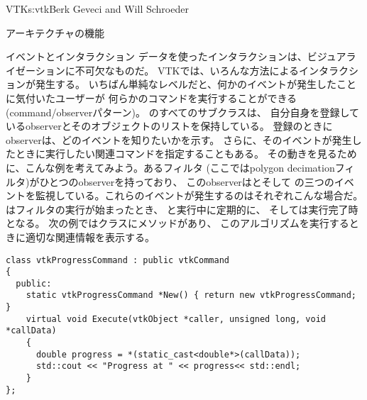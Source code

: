 \begin{aosachapter}{VTK}{s:vtk}{Berk Geveci and Will Schroeder}
\begin{aosasect1}{アーキテクチャの機能}
\begin{aosasect2}{イベントとインタラクション}
データを使ったインタラクションは、ビジュアライゼーションに不可欠なものだ。
VTKでは、いろんな方法によるインタラクションが発生する。
いちばん単純なレベルだと、何かのイベントが発生したことに気付いたユーザーが
何らかのコマンドを実行することができる(command/observerパターン)。
のすべてのサブクラスは、
自分自身を登録しているobserverとそのオブジェクトのリストを保持している。
登録のときにobserverは、どのイベントを知りたいかを示す。
さらに、そのイベントが発生したときに実行したい関連コマンドを指定することもある。
その動きを見るために、こんな例を考えてみよう。あるフィルタ
(ここではpolygon decimationフィルタ)がひとつのobserverを持っており、
このobserverはとそして
の三つのイベントを監視している。これらのイベントが発生するのはそれぞれこんな場合だ。
はフィルタの実行が始まったとき、
と実行中に定期的に、
そしては実行完了時となる。
次の例ではクラスにメソッドがあり、
このアルゴリズムを実行するときに適切な関連情報を表示する。

\begin{verbatim}
class vtkProgressCommand : public vtkCommand
{
  public:
    static vtkProgressCommand *New() { return new vtkProgressCommand; }
    virtual void Execute(vtkObject *caller, unsigned long, void *callData)
    {
      double progress = *(static_cast<double*>(callData));
      std::cout << "Progress at " << progress<< std::endl;
    }
};


\end{verbatim}
\end{aosasect2}
\end{aosasect1}
\end{aosachapter}
